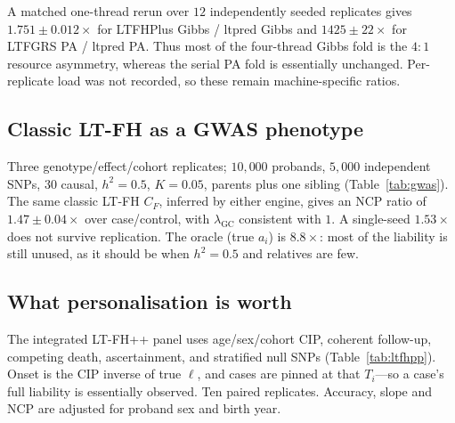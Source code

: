 \documentclass[11pt,a4paper]{article}
\newcommand{\h}{h^{2}}
\begin{document}
A matched one-thread rerun over $12$ independently seeded replicates gives
$1.751\pm 0.012\times$ for LTFHPlus Gibbs / ltpred Gibbs and
$1425\pm 22\times$ for LTFGRS PA / ltpred PA.  Thus most of the
four-thread Gibbs fold is the $4{:}1$ resource asymmetry, whereas the
serial PA fold is essentially unchanged.  Per-replicate load was not
recorded, so these remain machine-specific ratios.

\subsection{Classic LT-FH as a GWAS phenotype}

Three genotype/effect/cohort replicates; $10{,}000$ probands,
$5{,}000$ independent SNPs, $30$ causal, $\h=0.5$, $K=0.05$,
parents plus one sibling (Table~\ref{tab:gwas}).
The same classic LT-FH $C_F$, inferred by either engine, gives an
NCP ratio of $1.47\pm 0.04\times$ over case/control, with
$\lambda_{\mathrm{GC}}$ consistent with $1$.
A single-seed $1.53\times$ does not survive replication.
The oracle (true $a_i$) is $8.8\times$: most of the liability is
still unused, as it should be when $\h=0.5$ and relatives are few.

\begin{table}[ht]
\centering
\caption{Independent-SNP marginal-association simulation.
NCP uses $\overline{\chi^{2}}-1$.
Power is the fraction of causal SNPs at $p<5\times 10^{-8}$.}
\label{tab:gwas}
\small
\resizebox{\textwidth}{!}{}
\end{table}
\FloatBarrier

\subsection{What personalisation is worth}

The integrated LT-FH++ panel uses age/sex/cohort CIP, coherent
follow-up, competing death, ascertainment, and stratified null
SNPs (Table~\ref{tab:ltfhpp}).
Onset is the CIP inverse of true $\ell$, and cases are pinned at
that $T_i$---so a case's full liability is essentially observed.
Ten paired replicates.
Accuracy, slope and NCP are adjusted for proband sex and birth
year.

\begin{table}[ht]
\centering
\caption{Integrated personalised LT-FH++ independent-SNP marginal association, ten paired
replicates.
NCP is $(\overline{\chi^{2}}-1)$ over case/control.
The last column is stratified-null $\lambda_{\mathrm{GC}}$ before
and after the same covariate adjustment.}
\label{tab:ltfhpp}
\small
\resizebox{\textwidth}{!}{}
\end{table}
\end{document}
